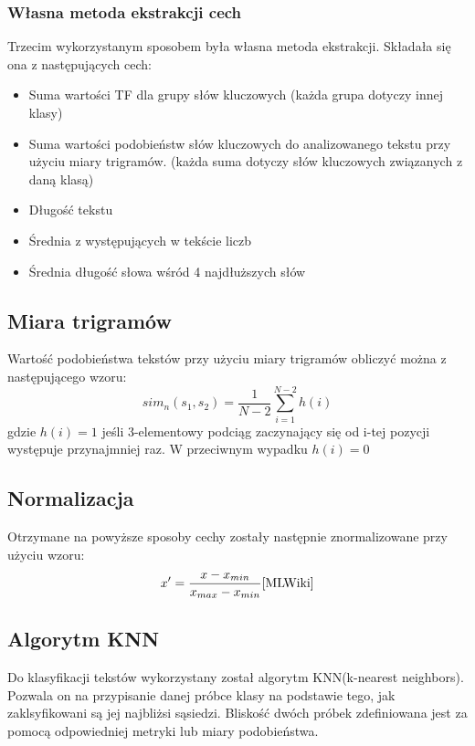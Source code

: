 \documentclass{classrep}
\begin{document}
\subsubsection{Własna metoda ekstrakcji cech}
Trzecim wykorzystanym sposobem była własna metoda ekstrakcji. Składała się ona z następujących cech:
\begin{itemize}
	\item Suma wartości TF dla grupy słów kluczowych (każda grupa dotyczy innej klasy)
	\item Suma wartości podobieństw słów kluczowych do analizowanego tekstu przy użyciu miary trigramów. (każda suma dotyczy słów kluczowych związanych z daną klasą) \cite{ANiewSkrypt}
	\item Długość tekstu
	\item Średnia z występujących w tekście liczb
	\item Średnia długość słowa wśród 4 najdłuższych słów
\end{itemize}

\subsection{Miara trigramów}
Wartość podobieństwa tekstów przy użyciu miary trigramów obliczyć można z następującego wzoru:
\begin{equation}
sim_{n}(s_{1}, s_{2}) = \frac{1}{N-2}\sum_{i=1}^{N-2}h(i)
\end{equation}
 gdzie \(h(i) = 1\) jeśli 3-elementowy podciąg zaczynający się od i-tej pozycji występuje przynajmniej raz. W przeciwnym wypadku \(h(i) = 0\)

\subsection{Normalizacja}
Otrzymane na powyższe sposoby cechy zostały następnie znormalizowane przy użyciu wzoru:
\begin{equation}
x' = \frac{x-x_{min}}{x_{max}-x_{min}} \cite{MLWiki}
\end{equation}

\subsection{Algorytm KNN}
Do klasyfikacji tekstów wykorzystany został algorytm KNN(k-nearest neighbors). Pozwala on na przypisanie danej próbce klasy na podstawie tego, jak zaklsyfikowani są jej najbliżsi sąsiedzi. Bliskość dwóch próbek zdefiniowana jest za pomocą odpowiedniej metryki lub miary podobieństwa. \cite{KNNWiki}
\end{document}
